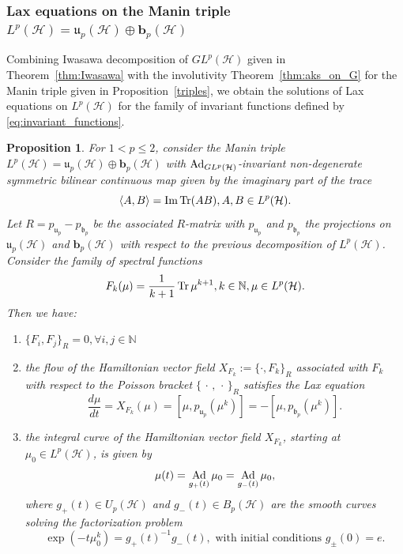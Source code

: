 \documentclass[a4paper,12pt,reqno]{amsart}%
\newtheorem{proposition}[theorem]{Proposition}
\theoremstyle{definition}
\theoremstyle{remark}
\numberwithin{theorem}{section}
\numberwithin{equation}{section}
\newcommand{\1}{{\bf 1}}
\newcommand{\pb}{\{\,\cdot\,,\,\cdot\,\}}
\DeclareMathOperator{\Ad}{\textnormal{Ad}}
\DeclareMathOperator{\Tr}{\textnormal{Tr}}
\DeclareMathOperator{\im}{\textnormal{Im}}
\renewcommand\b{{\mathbf{b}}}
\begin{document}
\subsubsection{Lax equations on the Manin triple $L^p(\mathcal{H}) = \mathfrak{u}_p(\mathcal{H})\oplus\b_p(\mathcal{H})$}

Combining Iwasawa decomposition of $GL^p(\mathcal H)$ given in Theorem~\ref{thm:Iwasawa} with the involutivity Theorem~\ref{thm:aks_on_G} for the Manin triple given in Proposition~\ref{triples}, we obtain the solutions of Lax equations on $L^p(\mathcal{H})$ for the family of  invariant functions defined by \eqref{eq:invariant_functions}. 

\begin{proposition}
    For $1<p\leq 2$, consider the Manin triple $L^p(\mathcal{H}) = \mathfrak{u}_p(\mathcal{H})\oplus\b_p(\mathcal{H})$ with $\Ad_{GL^p(\mathcal H)}$-invariant non-degenerate symmetric bilinear continuous map given by the imaginary part of the trace
    \begin{equation}
        \langle A, B\rangle = \im \Tr (AB), A, B \in L^p(\mathcal{H}).
    \end{equation}
    Let $R = p_{\mathfrak{u}_p} - p_{\mathfrak{b}_p}$ be the associated $R$-matrix with $p_{\mathfrak{u}_p}$ and $p_{\mathfrak{b}_p}$ the projections on $\mathfrak{u}_p(\mathcal{H})$ and $\b_p(\mathcal{H})$ with respect to the previous decomposition of $L^p(\mathcal{H})$. 
    Consider the family of spectral functions 
    \begin{equation}
    F_k(\mu) = \frac{1}{k+1}\Tr \mu^{k+1}, k\in\mathbb{N}, \mu \in L^p(\mathcal H).
    \end{equation}
    Then we have:
    \begin{enumerate}
        \item $\{F_{i}, F_j\}_R = 0, \forall i,j \in\mathbb{N}$
        \item the flow of the Hamiltonian vector field $X_{F_k}:= \{\cdot, F_k\}_R$ associated with $F_k$ with respect to the Poisson bracket $\pb_R$ satisfies the Lax equation
        \begin{equation}
            \frac{d\mu}{dt} = X_{F_k}(\mu) =   \left[\mu, p_{\mathfrak{u}_p}(\mu^{k})\right] = -\left[\mu, p_{\mathfrak{b}_p}(\mu^{k})\right].
        \end{equation}
        \item the integral curve of the Hamiltonian vector field $X_{F_k}$, starting at $\mu_0\in L^p(\mathcal{H})$, is given by
    \[
    \mu(t) = \Ad_{g_+(t)}\mu_0 = \Ad_{g_-(t)}\mu_0,
    \]
    where $g_+(t)\in U_p(\mathcal{H})$ and $g_-(t)\in B_p(\mathcal{H})$ are the smooth curves solving the factorization problem
    \begin{equation}
    \exp(-t  \mu_0^{k}) = g_+(t)^{-1} g_-(t), \textrm{  with initial conditions } g_\pm(0) = e.
    \end{equation}
    \end{enumerate}
\end{proposition}
\end{document}
